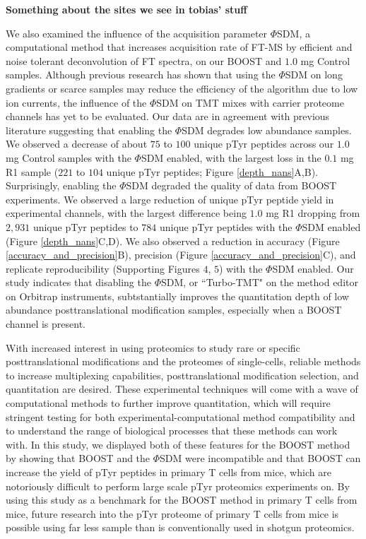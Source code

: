 \documentclass[journal=jprobs,manuscript=article]{achemso}
\begin{document}
\textbf{Something about the sites we see in tobias' stuff}

We also examined the influence of the acquisition parameter $\Phi$SDM, a computational method that increases acquisition rate of FT-MS by efficient and noise tolerant deconvolution of FT spectra\cite{grinfeld2017phase}, on our BOOST and $1.0$ mg Control samples. Although previous research has shown that using the $\Phi$SDM on long gradients or scarce samples may reduce the efficiency of the algorithm due to low ion currents\cite{grinfeld2017phase,yu2020benchmarking,kelstrup2018limits}, the influence of the $\Phi$SDM on TMT mixes with carrier proteome channels has yet to be evaluated. Our data are in agreement with previous literature suggesting that enabling the $\Phi$SDM degrades low abundance samples. We observed a decrease of about $75$ to $100$ unique pTyr peptides across our $1.0$ mg Control samples with the $\Phi$SDM enabled, with the largest loss in the $0.1$ mg R1 sample ($221$ to $104$ unique pTyr peptides; Figure \ref{depth_nans}A,B). Surprisingly, enabling the $\Phi$SDM degraded the quality of data from BOOST experiments. We observed a large reduction of unique pTyr peptide yield in experimental channels, with the largest difference being $1.0$ mg R1 dropping from $2{,}931$ unique pTyr peptides to $784$ unique pTyr peptides with the $\Phi$SDM enabled (Figure \ref{depth_nans}C,D). We also observed a reduction in accuracy (Figure \ref{accuracy_and_precision}B), precision (Figure \ref{accuracy_and_precision}C), and replicate reproducibility (Supporting Figures $4$, $5$) with the $\Phi$SDM enabled. Our study indicates that disabling the $\Phi$SDM, or ``Turbo-TMT" on the method editor on Orbitrap instruments, subtstantially improves the quantitation depth of low abundance posttranslational modification samples, especially when a BOOST channel is present.

With increased interest in using proteomics to study rare or specific posttranslational modifications\cite{millan2020histone,yao2019one,fulzele2018ubiquitin} and the proteomes of single-cells\cite{petelski2021multiplexed,cheung2021defining,vistain2021single}, reliable methods to increase multiplexing capabilities\cite{arul2018sample}, posttranslational modification selection\cite{pieroni2020enrichments}, and quantitation\cite{chua2020tandem,chua2021ovalbumin,pino2020acquiring} are desired. These experimental techniques will come with a wave of computational methods to further improve quantitation\cite{grinfeld2017phase,sinitcyn2021maxdia,bilbao2018algorithm}, which will require stringent testing for both experimental-computational method compatibility and to understand the range of biological processes that these methods can work with. In this study, we displayed both of these features for the BOOST method by showing that BOOST and the $\Phi$SDM were incompatible and that BOOST can increase the yield of pTyr peptides in primary T cells from mice, which are notoriously difficult to perform large scale pTyr proteomics experiments on\cite{locard2020lymphoatlas}. By using this study as a benchmark for the BOOST method in primary T cells from mice, future research into the pTyr proteome of primary T cells from mice is possible using far less sample than is conventionally used in shotgun proteomics.
\end{document}
